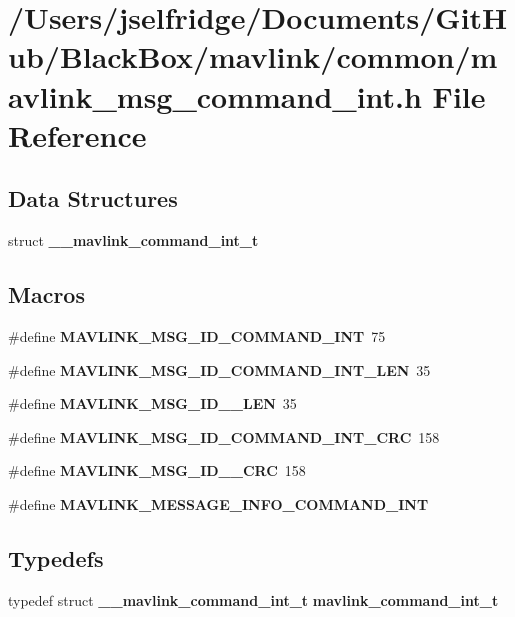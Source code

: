 \section{/\+Users/jselfridge/\+Documents/\+Git\+Hub/\+Black\+Box/mavlink/common/mavlink\+\_\+msg\+\_\+command\+\_\+int.h File Reference}
\label{mavlink__msg__command__int_8h}
\subsection*{Data Structures}
\begin{DoxyCompactItemize}
\item 
struct \textbf{ \+\_\+\+\_\+mavlink\+\_\+command\+\_\+int\+\_\+t}
\end{DoxyCompactItemize}
\subsection*{Macros}
\begin{DoxyCompactItemize}
\item 
\#define \textbf{ M\+A\+V\+L\+I\+N\+K\+\_\+\+M\+S\+G\+\_\+\+I\+D\+\_\+\+C\+O\+M\+M\+A\+N\+D\+\_\+\+I\+NT}~75
\item 
\#define \textbf{ M\+A\+V\+L\+I\+N\+K\+\_\+\+M\+S\+G\+\_\+\+I\+D\+\_\+\+C\+O\+M\+M\+A\+N\+D\+\_\+\+I\+N\+T\+\_\+\+L\+EN}~35
\item 
\#define \textbf{ M\+A\+V\+L\+I\+N\+K\+\_\+\+M\+S\+G\+\_\+\+I\+D\+\_\+\_\+\+L\+EN}~35
\item 
\#define \textbf{ M\+A\+V\+L\+I\+N\+K\+\_\+\+M\+S\+G\+\_\+\+I\+D\+\_\+\+C\+O\+M\+M\+A\+N\+D\+\_\+\+I\+N\+T\+\_\+\+C\+RC}~158
\item 
\#define \textbf{ M\+A\+V\+L\+I\+N\+K\+\_\+\+M\+S\+G\+\_\+\+I\+D\+\_\+\_\+\+C\+RC}~158
\item 
\#define \textbf{ M\+A\+V\+L\+I\+N\+K\+\_\+\+M\+E\+S\+S\+A\+G\+E\+\_\+\+I\+N\+F\+O\+\_\+\+C\+O\+M\+M\+A\+N\+D\+\_\+\+I\+NT}
\end{DoxyCompactItemize}
\subsection*{Typedefs}
\begin{DoxyCompactItemize}
\item 
typedef struct \textbf{ \+\_\+\+\_\+mavlink\+\_\+command\+\_\+int\+\_\+t} \textbf{ mavlink\+\_\+command\+\_\+int\+\_\+t}
\end{DoxyCompactItemize}


